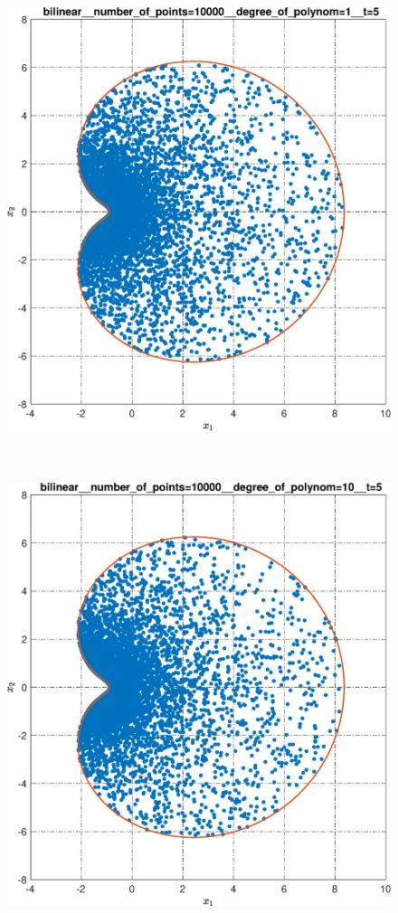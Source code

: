 \documentclass[../main.tex]{subfiles}
\begin{document}
\begin{figure}[ht!]
\begin{minipage}[b]{.3\linewidth}
  		\includegraphics[width=\linewidth]{images/bilinear__number_of_points=10000__degree_of_polynom=1__t=5.eps}
  	\end{minipage}
  	\hfill
  	\begin{minipage}[b]{.3\linewidth} 
  		\small
  		\centering
  		\includegraphics[width=\linewidth]{images/bilinear__number_of_points=10000__degree_of_polynom=10__t=5.eps}

\end{minipage}
\end{figure}
\end{document}
